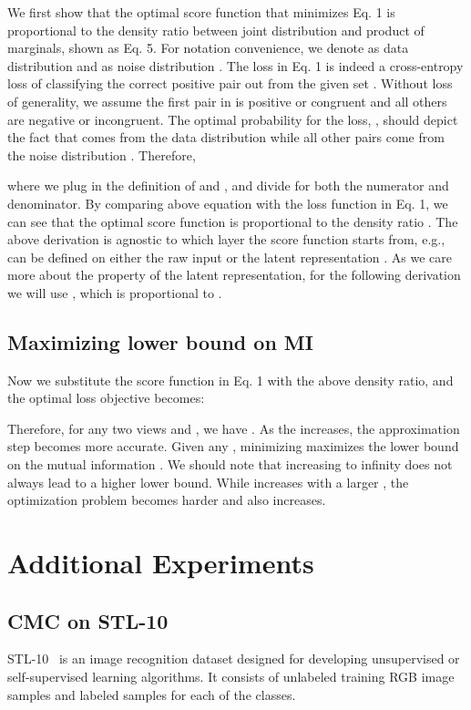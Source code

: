 \documentclass[10pt,twocolumn,letterpaper]{article}
\newcommand{\citep}[1]{\cite{#1}}
\begin{document}
We first show that the optimal score function  that minimizes Eq. 1 is proportional to  the density ratio between joint distribution and product of marginals, shown as Eq. 5. For notation convenience, we denote  as data distribution  and  as noise distribution . The loss in Eq. 1 is indeed a cross-entropy loss of classifying the correct positive pair out from the given set . Without loss of generality, we assume the first pair  in  is positive or congruent and all others  are negative or incongruent. The optimal probability for the loss, , should depict the fact that  comes from the data distribution  while all other pairs come from the noise distribution . Therefore,

where we plug in the definition of  and , and divide  for both the numerator and denominator. By comparing above equation with the loss function in Eq. 1, we can see that the optimal score function  is proportional to the density ratio . The above derivation is agnostic to which layer the score function starts from, e.g.,  can be defined on either the raw input  or the latent representation . As we care more about the property of the latent representation, for the following derivation we will use , which is proportional to .

\subsection{Maximizing lower bound on MI}
\label{sec:app:mi}

Now we substitute the score function in Eq. 1 with the above density ratio, and the optimal loss objective  becomes:

Therefore, for any two views  and , we have . 
As the  increases, the approximation step becomes more accurate. Given any , minimizing  maximizes the lower bound on the mutual information . We should note that increasing  to infinity does not always lead to a higher lower bound. While  increases with a larger , the optimization problem becomes harder and  also increases.


\section{Additional Experiments}




\subsection{CMC on STL-10}\label{exp:stl-10}
STL-10~\citep{coates2011analysis} is an image recognition dataset designed for developing unsupervised or self-supervised learning algorithms. It consists of  unlabeled training  RGB image samples and  labeled samples for each of the  classes. 
\end{document}
